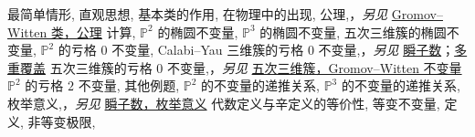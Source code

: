 \begin{theindex}
\subsubitem \leavevmode\hypertarget{idx:0518}{最简单情形},\enspace{}
\subsubitem \leavevmode\hypertarget{idx:0519}{直观思想},\enspace{}
\subsubitem \leavevmode\hypertarget{idx:0520}{基本类的作用},\enspace{}
\subitem \leavevmode\hypertarget{idx:0521}{在物理中的出现},\enspace{}
\subitem \leavevmode\hypertarget{idx:0522}{公理},\enspace{}，\textit{另见} \hyperlink{idx:0495}{Gromov--Witten 类，公理}
\subitem \leavevmode\hypertarget{idx:0523}{计算},\enspace{}
\subsubitem \leavevmode\hypertarget{idx:0524}{$\mathbb P^2$ 的椭圆不变量},\enspace{}
\subsubitem \leavevmode\hypertarget{idx:0525}{$\mathbb P^3$ 的椭圆不变量},\enspace{}
\subsubitem \leavevmode\hypertarget{idx:0526}{五次三维簇的椭圆不变量},\enspace{}
\subsubitem \leavevmode\hypertarget{idx:0527}{$\mathbb P^2$ 的亏格 $0$ 不变量},\enspace{}
\subsubitem \leavevmode\hypertarget{idx:0528}{Calabi--Yau 三维簇的亏格 $0$ 不变量},\enspace{}，\textit{另见} \hyperlink{idx:0628}{瞬子数}；\hyperlink{idx:0915}{多重覆盖}
\subsubitem \leavevmode\hypertarget{idx:0529}{五次三维簇的亏格 $0$ 不变量},\enspace{}，\textit{另见} \hyperlink{idx:1186}{五次三维簇，Gromov--Witten 不变量}
\subsubitem \leavevmode\hypertarget{idx:0530}{$\mathbb P^2$ 的亏格 $2$ 不变量},\enspace{}
\subsubitem \leavevmode\hypertarget{idx:0531}{其他例题},\enspace{}
\subsubitem \leavevmode\hypertarget{idx:0532}{$\mathbb P^2$ 的不变量的递推关系},\enspace{}
\subsubitem \leavevmode\hypertarget{idx:0533}{$\mathbb P^3$ 的不变量的递推关系},\enspace{}
\subitem \leavevmode\hypertarget{idx:0534}{枚举意义},\enspace{}，\textit{另见} \hyperlink{idx:0632}{瞬子数，枚举意义}
\subitem \leavevmode\hypertarget{idx:0535}{代数定义与辛定义的等价性},\enspace{}
\subitem \leavevmode\hypertarget{idx:0536}{等变不变量},\enspace{}
\subsubitem \leavevmode\hypertarget{idx:0537}{定义},\enspace{}
\subsubitem \leavevmode\hypertarget{idx:0538}{非等变极限},\enspace{}

\end{theindex}
